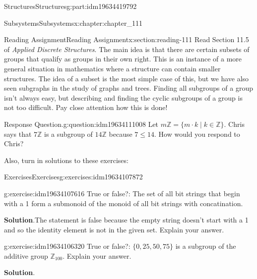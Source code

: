 \documentclass[oneside,10pt,]{book}
\newcommand{\blocktitlefont}{\relax}
\numberwithin{equation}{section}
\begin{document}
\begin{partptx}{Structures}{}{Structures}{}{}{g:part:idm19634419792}
\begin{chapterptx}{Subsystems}{}{Subsystems}{}{}{x:chapter:chapter_111}
\begin{sectionptx}{Reading Assignment}{}{Reading Assignment}{}{}{x:section:reading-111}
Read Section 11.5 of \emph{Applied Discrete Structures}. The main idea is that there are certain subsets of groups that qualify as groups in their own right.  This is an instance of a more general situation in mathematics where a structure can contain smaller structures.  The idea of a subset is the most simple case of this, but we have also seen subgraphs in the study of graphs and trees.  Finding all subgroups of a group isn't always easy, but describing and finding the cyclic subgroups of a group is not too difficult.  Pay close attention how this is done!%
\begin{question}{Response Question.}{g:question:idm19634111008}%
Let \(m \mathbb{Z} = \{m \cdot k \mid k \in \mathbb{Z}\}\). Chris says that \(7 \mathbb{Z}\) is a subgroup of \(14 \mathbb{Z}\) because \(7 \leq 14\).   How would you respond to Chris?%
\end{question}
Also, turn in solutions to these exercises:%
%
%
\typeout{************************************************}
\typeout{************************************************}
%
\begin{exercises-subsection-numberless}{Exercises}{}{Exercises}{}{}{g:exercises:idm19634107872}
\par\medskip\noindent%
%
\begin{exercisegroup}
\begin{divisionexerciseeg}{1}{}{}{g:exercise:idm19634107616}%
True or false?:  The set of all bit strings that begin with a 1 form a submonoid of the monoid of all bit strings with concatination.%
\par\smallskip%
\noindent\textbf{\blocktitlefont Solution}.\hypertarget{g:solution:idm19634107488}{}\quad{}The statement is false because the empty string doesn't start with a 1 and so the identity element is not in the given set. Explain your answer.%
\end{divisionexerciseeg}%
\begin{divisionexerciseeg}{2}{}{}{g:exercise:idm19634106320}%
True or false?: \(\{0,25,50,75\}\) is a subgroup of the additive group \(\mathbb{Z}_{100}\). Explain your answer.%
\par\smallskip%
\noindent\textbf{\blocktitlefont Solution}.\hypertarget{g:solution:idm19634106192}{}\quad{}%
\end{divisionexerciseeg}%
\end{exercisegroup}
\par\medskip\noindent
\end{exercises-subsection-numberless}

\end{sectionptx}
\end{chapterptx}
\end{partptx}
\end{document}
